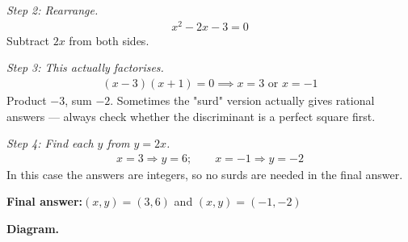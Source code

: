 \documentclass[11pt]{article}
\begin{document}
\textit{Step 2: Rearrange.}
\[\begin{gathered}
x^2 - 2x - 3 = 0
\end{gathered}\]
Subtract \( 2x \) from both sides.

\textit{Step 3: This actually factorises.}
\[\begin{gathered}
(x - 3)(x + 1) = 0 \implies x = 3 \text{ or } x = -1
\end{gathered}\]
Product \( -3 \), sum \( -2 \). Sometimes the "surd" version actually gives rational answers --- always check whether the discriminant is a perfect square first.

\textit{Step 4: Find each \( y \) from \( y = 2x \).}
\[\begin{gathered}
x = 3 \Rightarrow y = 6; \qquad x = -1 \Rightarrow y = -2
\end{gathered}\]
In this case the answers are integers, so no surds are needed in the final answer.

\begin{answerbox}
\textbf{Final answer:}\quad \(\displaystyle (x, y) = (3, 6)\) and \(\displaystyle (x, y) = (-1, -2)\)
\end{answerbox}
\textbf{Diagram.}
\end{document}
